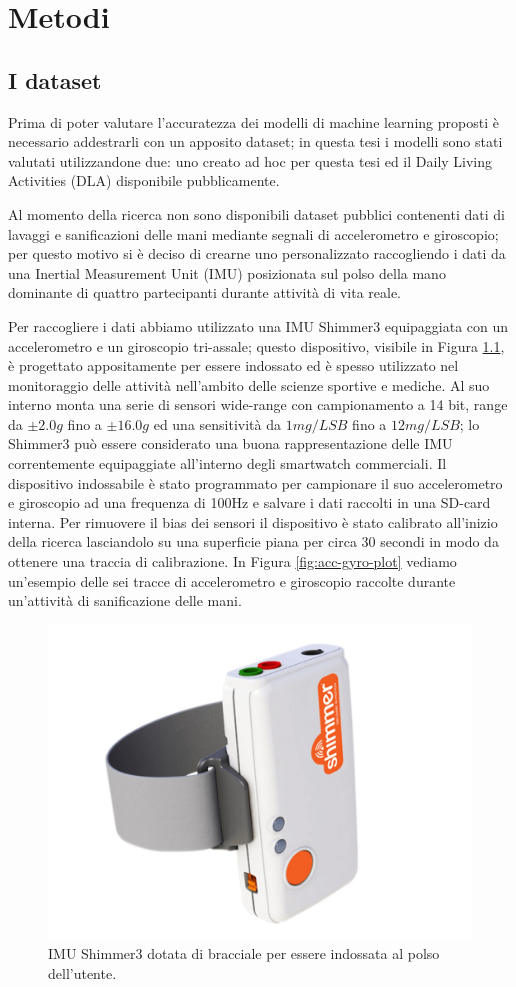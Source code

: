 \chapter{Metodi}
\label{cap:metodi}

\section{I dataset}
\label{sec:dataset}

Prima di poter valutare l'accuratezza dei modelli di machine learning proposti è necessario addestrarli con un apposito dataset; in questa tesi i modelli sono stati valutati utilizzandone due: uno creato ad hoc per questa tesi ed il Daily Living Activities (DLA) disponibile pubblicamente\cite{leotta2021daily}.

Al momento della ricerca non sono disponibili dataset pubblici contenenti dati di lavaggi e sanificazioni delle mani mediante segnali di accelerometro e giroscopio; per questo motivo si è deciso di crearne uno personalizzato raccogliendo i dati da una Inertial Measurement Unit (IMU) posizionata sul polso della mano dominante di quattro partecipanti durante attività di vita reale.

Per raccogliere i dati abbiamo utilizzato una IMU Shimmer3 equipaggiata con un accelerometro e un giroscopio tri-assale\cite{shimmer}; questo dispositivo, visibile in Figura \ref{fig:shimmer}, è progettato appositamente per essere indossato ed è spesso utilizzato nel monitoraggio delle attività nell'ambito delle scienze sportive e mediche. Al suo interno monta una serie di sensori wide-range con campionamento a 14 bit, range da $\pm2.0g$ fino a $\pm16.0g$ ed una sensitività da $1mg/LSB$ fino a $12mg/LSB$; lo Shimmer3 può essere considerato una buona rappresentazione delle IMU correntemente equipaggiate all'interno degli smartwatch commerciali. Il dispositivo indossabile è stato programmato per campionare il suo accelerometro e giroscopio ad una frequenza di 100Hz e salvare i dati raccolti in una SD-card interna. Per rimuovere il bias dei sensori il dispositivo è stato calibrato all'inizio della ricerca lasciandolo su una superficie piana per circa 30 secondi in modo da ottenere una traccia di calibrazione.
In Figura \ref{fig:acc-gyro-plot} vediamo un'esempio delle sei tracce di accelerometro e giroscopio raccolte durante un'attività di sanificazione delle mani.

\begin{figure}[!htb]
    \centering
    \includegraphics[width=.4\textwidth]{figure/shimmer.jpg}
    \caption{IMU Shimmer3 dotata di bracciale per essere indossata al polso dell'utente.}
    \label{fig:shimmer}
\end{figure}

